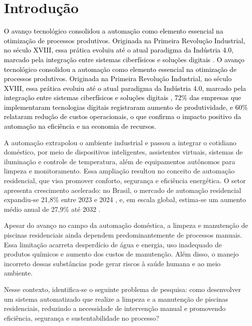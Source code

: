 \chapter{Introdução}

\textcolor{black}{O avanço tecnológico consolidou a automação como elemento essencial na otimização de processos produtivos. Originada na Primeira Revolução Industrial, no século XVIII, essa prática evoluiu até o atual paradigma da Indústria 4.0, marcado pela integração entre sistemas ciberfísicos e soluções digitais \cite{automacao}. O avanço tecnológico consolidou a automação como elemento essencial na otimização de processos produtivos. Originada na Primeira Revolução Industrial, no século XVIII, essa prática evoluiu até o atual paradigma da Indústria 4.0, marcado pela integração entre sistemas ciberfísicos e soluções digitais \cite{CNI}, 72\% das empresas que implementaram tecnologias digitais registraram aumento de produtividade, e 60\% relataram redução de custos operacionais, o que confirma o impacto positivo da automação na eficiência e na economia de recursos.}

A automação extrapolou o ambiente industrial e passou a integrar o cotidiano doméstico, por meio de dispositivos inteligentes, assistentes virtuais, sistemas de iluminação e controle de temperatura, além de equipamentos autônomos para limpeza e monitoramento. Essa ampliação resultou no conceito de automação residencial, que visa promover conforto, segurança e eficiência energética. O setor apresenta crescimento acelerado: no Brasil, o mercado de automação residencial expandiu-se 21,8\% entre 2023 e 2024 \cite{cresceuBR}, e, em escala global, estima-se um aumento médio anual de 27,9\% até 2032 \cite{aumentoAosAnos}.


Apesar do avanço no campo da automação doméstica, a limpeza e manutenção de piscinas residenciais ainda dependem predominantemente de processos manuais. Essa limitação acarreta desperdício de água e energia, uso inadequado de produtos químicos e aumento dos custos de manutenção. Além disso, o manejo incorreto dessas substâncias pode gerar riscos à saúde humana e ao meio ambiente.

Nesse contexto, identifica-se o seguinte problema de pesquisa: como desenvolver um sistema automatizado que realize a limpeza e a manutenção de piscinas residenciais, reduzindo a necessidade de intervenção manual e promovendo eficiência, segurança e sustentabilidade no processo?

